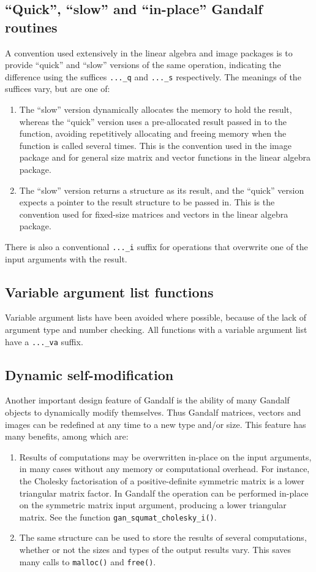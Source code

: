 \subsection{``Quick'', ``slow'' and ``in-place'' Gandalf routines}
A convention used extensively in the linear algebra and image packages is
to provide ``quick'' and ``slow'' versions of the same operation,
indicating the difference using the suffices {\tt ...\_q} and {\tt ...\_s}
respectively. The meanings of the suffices vary, but are one of:
\begin{enumerate}
  \item The ``slow'' version dynamically allocates the memory to hold the
	result, whereas the ``quick'' version uses a pre-allocated result
	passed in to the function, avoiding repetitively allocating and
	freeing memory when the function is called several times.
	This is the convention used in the image package and for general size
	matrix and vector functions in the linear algebra package.
  \item The ``slow'' version returns a structure as its result, and the
	``quick'' version expects a pointer to the result structure to be
	passed in. This is the convention used for fixed-size matrices and
	vectors in the linear algebra package.
\end{enumerate}
There is also a conventional {\tt ...\_i} suffix for operations that overwrite
one of the input arguments with the result.

\subsection{Variable argument list functions}
Variable argument lists have been avoided where possible, because of the
lack of argument type and number checking. All functions with a variable
argument list have a {\tt ...\_va} suffix.

\subsection{Dynamic self-modification}
Another important design feature of Gandalf is the ability of many Gandalf
objects to dynamically modify themselves. Thus Gandalf matrices, vectors and
images can be redefined at any time to a new type and/or size.
This feature has many benefits, among which are:
\begin{enumerate}
  \item Results of computations may be overwritten in-place on the input
	arguments, in many cases without any memory or computational overhead.
	For instance, the Cholesky factorisation of a positive-definite
	symmetric matrix is a lower triangular matrix factor. In Gandalf
	the operation can be performed in-place on the symmetric matrix
	input argument, producing a lower triangular matrix.
	See the function {\tt gan\_squmat\_cholesky\_i()}.

  \item The same structure can be used to store the results of several
	computations, whether or not the sizes and types of the output
	results vary. This saves many calls to {\tt malloc()} and {\tt free()}.
\end{enumerate}

